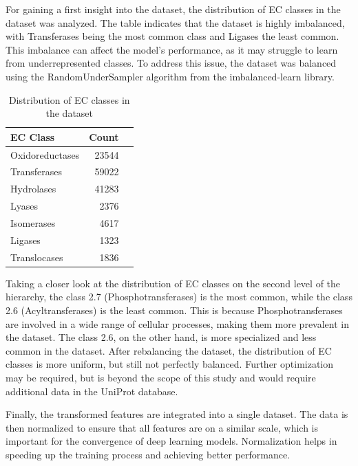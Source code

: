 For gaining a first insight into the dataset, the distribution of EC classes in the dataset was analyzed. The table indicates that the dataset is highly imbalanced, with Transferases being the most common class and Ligases the least common. This imbalance can affect the model's performance, as it may struggle to learn from underrepresented classes. To address this issue, the dataset was balanced using the RandomUnderSampler algorithm from the imbalanced-learn library.

\begin{table}[hbt]
    \centering
    \begin{tabular}{lrr}
        \toprule
        EC Class & Count \\
        \midrule
        Oxidoreductases & 23544 \\
        Transferases & 59022 \\
        Hydrolases & 41283 \\
        Lyases & 2376 \\
        Isomerases & 4617 \\
        Ligases & 1323 \\
        Translocases & 1836 \\
        \bottomrule
    \end{tabular}
    \caption{Distribution of EC classes in the dataset}
    \label{tab:ec-class-distribution}
\end{table}

Taking a closer look at the distribution of EC classes on the second level of the hierarchy, the class 2.7 (Phosphotransferases) is the most common, while the class 2.6 (Acyltransferases) is the least common. This is because Phosphotransferases are involved in a wide range of cellular processes, making them more prevalent in the dataset. The class 2.6, on the other hand, is more specialized and less common in the dataset. After rebalancing the dataset, the distribution of EC classes is more uniform, but still not perfectly balanced. Further optimization may be required, but is beyond the scope of this study and would require additional data in the UniProt database.

Finally, the transformed features are integrated into a single dataset. The data is then normalized to ensure that all features are on a similar scale, which is important for the convergence of deep learning models. Normalization helps in speeding up the training process and achieving better performance. \autocite{ioffeBatchNormalizationAccelerating2015}

